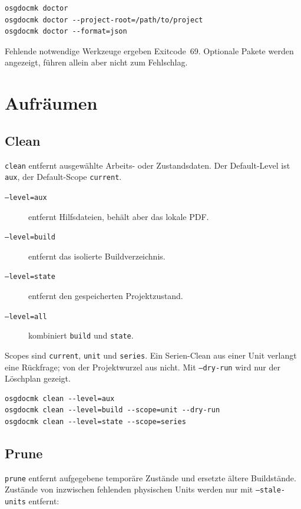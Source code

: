 \documentclass[
load-preamble+
]{osgdoc}
\begin{document}
\begin{verbatim}
osgdocmk doctor
osgdocmk doctor --project-root=/path/to/project
osgdocmk doctor --format=json
\end{verbatim}

Fehlende notwendige Werkzeuge ergeben Exitcode~69. Optionale Pakete werden
angezeigt, führen allein aber nicht zum Fehlschlag.

\section{Aufräumen}

\subsection{Clean}

\texttt{clean} entfernt ausgewählte Arbeits- oder Zustandsdaten. Der
Default-Level ist \texttt{aux}, der Default-Scope \texttt{current}.

\begin{description}
\item[\texttt{--level=aux}] entfernt Hilfsdateien, behält aber das lokale PDF.
\item[\texttt{--level=build}] entfernt das isolierte Buildverzeichnis.
\item[\texttt{--level=state}] entfernt den gespeicherten Projektzustand.
\item[\texttt{--level=all}] kombiniert \texttt{build} und \texttt{state}.
\end{description}

Scopes sind \texttt{current}, \texttt{unit} und \texttt{series}. Ein
Serien-Clean aus einer Unit verlangt eine Rückfrage; von der Projektwurzel aus
nicht. Mit \texttt{--dry-run} wird nur der Löschplan gezeigt.

\begin{verbatim}
osgdocmk clean --level=aux
osgdocmk clean --level=build --scope=unit --dry-run
osgdocmk clean --level=state --scope=series
\end{verbatim}

\subsection{Prune}

\texttt{prune} entfernt aufgegebene temporäre Zustände und ersetzte ältere
Buildstände. Zustände von inzwischen fehlenden physischen Units werden nur
mit \texttt{--stale-units} entfernt:
\end{document}
